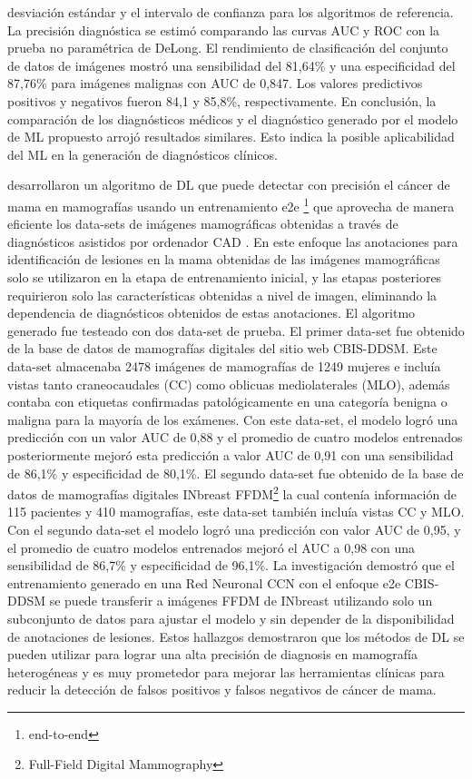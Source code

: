 desviación estándar y el intervalo de confianza para los algoritmos de referencia.  La precisión diagnóstica se estimó comparando las curvas AUC y ROC con la prueba no paramétrica de DeLong. El rendimiento de clasificación del conjunto de datos de imágenes mostró una sensibilidad del 81,64\% y una especificidad del 87,76\% para imágenes malignas con AUC de 0,847. Los valores predictivos positivos y negativos fueron 84,1 y 85,8\%, respectivamente. En conclusión, la comparación de los diagnósticos médicos y el diagnóstico generado por el modelo de ML propuesto arrojó resultados similares. Esto indica la posible aplicabilidad del ML en la generación de diagnósticos clínicos.

\cite{Shen2019} desarrollaron un algoritmo de DL que puede detectar con precisión el cáncer de mama en mamografías usando un entrenamiento e2e \footnote{end-to-end} que aprovecha de manera eficiente los data-sets de imágenes mamográficas obtenidas a través de diagnósticos asistidos por ordenador CAD . En este enfoque las anotaciones para identificación de lesiones en la mama obtenidas de las imágenes mamográficas solo se utilizaron en la etapa de entrenamiento inicial, y las etapas posteriores requirieron solo las características obtenidas a nivel de imagen, eliminando la dependencia de diagnósticos obtenidos de estas anotaciones. El algoritmo generado fue testeado con dos data-set de prueba. El primer data-set fue obtenido de la base de datos de mamografías digitales del sitio web CBIS-DDSM. Este data-set almacenaba 2478 imágenes de mamografías de 1249 mujeres e incluía vistas tanto craneocaudales (CC) como oblicuas mediolaterales (MLO), además contaba con etiquetas confirmadas patológicamente en una categoría benigna o maligna para la mayoría de los exámenes. Con este data-set, el modelo logró una predicción con un valor AUC de 0,88 y el promedio de cuatro modelos entrenados posteriormente mejoró esta predicción a valor AUC de 0,91 con una sensibilidad de 86,1\% y especificidad de 80,1\%. El segundo data-set fue obtenido de la base de datos de mamografías digitales INbreast FFDM\footnote{Full-Field Digital Mammography} la cual contenía información de 115 pacientes y 410 mamografías, este data-set también incluía vistas CC y MLO. Con el segundo data-set el modelo logró una predicción con valor AUC de 0,95, y el promedio de cuatro modelos entrenados mejoró el AUC a 0,98 con una sensibilidad de 86,7\% y especificidad de 96,1\%. La investigación demostró que el entrenamiento generado en una Red Neuronal CCN con el enfoque e2e CBIS-DDSM se puede transferir a imágenes FFDM de INbreast utilizando solo un subconjunto de datos para ajustar el modelo y sin depender de la disponibilidad de anotaciones de lesiones. Estos hallazgos demostraron que los métodos de DL se pueden utilizar para lograr una alta precisión de diagnosis en mamografía heterogéneas y es muy prometedor para mejorar las herramientas clínicas para reducir la detección de falsos positivos y falsos negativos de cáncer de mama.

